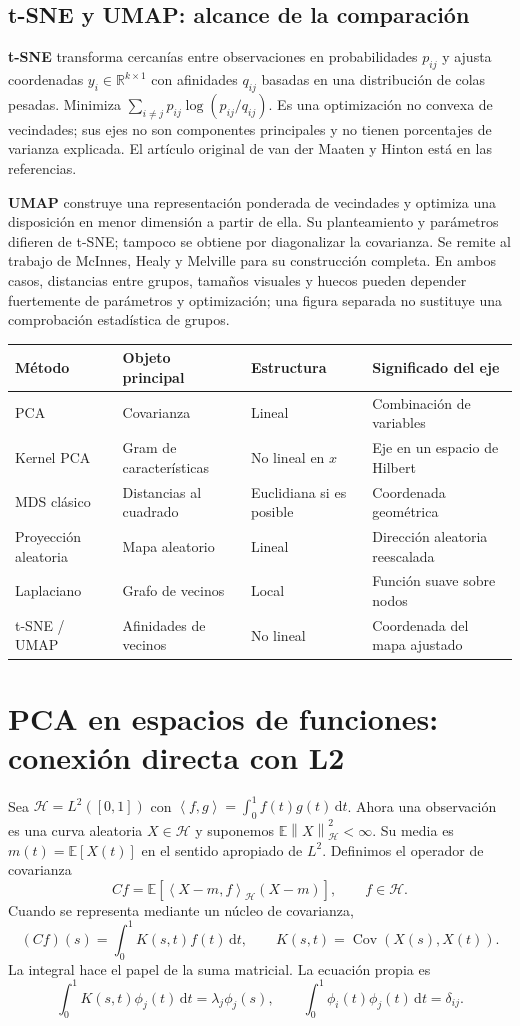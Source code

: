 \documentclass[11pt,a4paper]{article}
\newcommand{\R}{\mathbb R}
\newcommand{\E}{\mathbb E}
\newcommand{\dd}{\,\mathrm d}
\newcommand{\norm}[1]{\left\lVert #1\right\rVert}
\newcommand{\ip}[2]{\left\langle #1,#2\right\rangle}
\DeclareMathOperator{\Cov}{Cov}
\theoremstyle{definition}
\begin{document}
\subsection{t-SNE y UMAP: alcance de la comparación}
\textbf{t-SNE} transforma cercanías entre observaciones en probabilidades $p_{ij}$ y ajusta coordenadas $y_i\in\R^{k\times1}$ con afinidades $q_{ij}$ basadas en una distribución de colas pesadas. Minimiza $\sum_{i\ne j}p_{ij}\log(p_{ij}/q_{ij})$. Es una optimización no convexa de vecindades; sus ejes no son componentes principales y no tienen porcentajes de varianza explicada. El artículo original de van der Maaten y Hinton está en las referencias.

\textbf{UMAP} construye una representación ponderada de vecindades y optimiza una disposición en menor dimensión a partir de ella. Su planteamiento y parámetros difieren de t-SNE; tampoco se obtiene por diagonalizar la covarianza. Se remite al trabajo de McInnes, Healy y Melville para su construcción completa. En ambos casos, distancias entre grupos, tamaños visuales y huecos pueden depender fuertemente de parámetros y optimización; una figura separada no sustituye una comprobación estadística de grupos.
\begin{center}\small
\begin{tabular}{p{2.8cm}p{4.0cm}p{3.5cm}p{4.6cm}}\toprule
Método & Objeto principal & Estructura & Significado del eje\\\midrule
PCA & Covarianza & Lineal & Combinación de variables\\
Kernel PCA & Gram de características & No lineal en $x$ & Eje en un espacio de Hilbert\\
MDS clásico & Distancias al cuadrado & Euclidiana si es posible & Coordenada geométrica\\
Proyección aleatoria & Mapa aleatorio & Lineal & Dirección aleatoria reescalada\\
Laplaciano & Grafo de vecinos & Local & Función suave sobre nodos\\
t-SNE / UMAP & Afinidades de vecinos & No lineal & Coordenada del mapa ajustado\\\bottomrule
\end{tabular}\end{center}

\section{PCA en espacios de funciones: conexión directa con L2}
Sea $\mathcal H=L^2([0,1])$ con $\ip fg=\int_0^1f(t)g(t)\dd t$. Ahora una observación es una curva aleatoria $X\in\mathcal H$ y suponemos $\E\norm X_{\mathcal H}^2<\infty$. Su media es $m(t)=\E[X(t)]$ en el sentido apropiado de $L^2$. Definimos el operador de covarianza
\[
Cf=\E[\ip{X-m}f_{\mathcal H}(X-m)],\qquad f\in\mathcal H.
\]
Cuando se representa mediante un núcleo de covarianza,
\[
(Cf)(s)=\int_0^1K(s,t)f(t)\dd t,\qquad
K(s,t)=\Cov(X(s),X(t)).
\]
La integral hace el papel de la suma matricial. La ecuación propia es
\[
\boxed{\int_0^1K(s,t)\phi_j(t)\dd t=\lambda_j\phi_j(s)},\qquad
\int_0^1\phi_i(t)\phi_j(t)\dd t=\delta_{ij}.
\]
\end{document}
